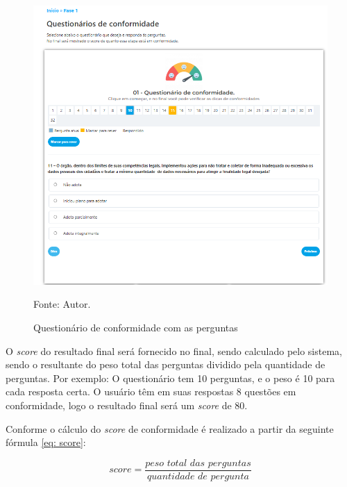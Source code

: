 \documentclass[
	12pt,				%
	openright,			%
	oneside,			%
	a4paper,			%
	english,			%
	french,				%
	spanish,			%
	brazil,				%
	]{abntex2}
\begin{document}
\begin{figure}[ht]
    \centering
    \caption{Questionário de conformidade com as perguntas}
    \includegraphics[width=6.2in]{Images/fase11.png}
    \label{fig: fase11}
    
    \centering \small Fonte: Autor.
\end{figure}

O \textit{score} do resultado final será fornecido no final, sendo calculado pelo sistema, sendo o resultante do peso total das perguntas dividido pela quantidade de perguntas. Por exemplo: O questionário tem 10 perguntas, e o peso é 10 para cada resposta certa. O usuário têm em suas respostas 8 questões em conformidade, logo o resultado final será um \textit{score} de 80.

Conforme o cálculo do \textit{score} de conformidade é realizado a partir da seguinte fórmula \ref{eq: score}: 

\begin{equation}
\label{eq: score}
    score = \frac {\textit{peso total das perguntas}} {\textit{quantidade de pergunta}}
\end{equation}

\pagebreak
\end{document}
